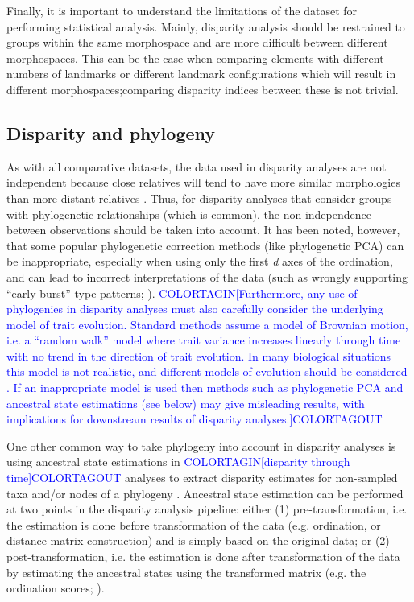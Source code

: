 \documentclass[12pt,letterpaper]{article}
\begin{document}
Finally, it is important to understand the limitations of the dataset for performing statistical analysis.
Mainly, disparity analysis should be restrained to groups within the same morphospace and are more difficult between different morphospaces.
This can be the case when comparing elements with different numbers of landmarks or different landmark configurations which will result in different morphospaces;comparing disparity indices between these is not trivial.

\subsection{Disparity and phylogeny} \label{section:phylo}

As with all comparative datasets, the data used in disparity analyses are not independent because close relatives will tend to have more similar morphologies than more distant relatives \citep{Harvey1998}.
Thus, for disparity analyses that consider groups with phylogenetic relationships (which is common), the non-independence between observations should be taken into account.
It has been noted, however, that some popular phylogenetic correction methods (like phylogenetic PCA) can be inappropriate, especially when using only the first \textit{d} axes of the ordination, and can lead to incorrect interpretations of the data (such as wrongly supporting ``early burst'' type patterns; \citealt{Uyeda2015}).
\textcolor{blue}{COLORTAGIN[Furthermore, any use of phylogenies in disparity analyses must also carefully consider the underlying model of trait evolution. Standard methods assume a model of Brownian motion, i.e. a ``random walk'' model where trait variance increases linearly through time with no trend in the direction of trait evolution. In many biological situations this model is not realistic, and different models of evolution should be considered \citealt{blomberg2020}. If an inappropriate model is used then methods such as phylogenetic PCA and ancestral state estimations (see below) may give misleading results, with implications for downstream results of disparity analyses.]COLORTAGOUT} 

One other common way to take phylogeny into account in disparity analyses is using ancestral state estimations in \textcolor{blue}{COLORTAGIN[disparity through time]COLORTAGOUT} analyses to extract disparity estimates for non-sampled taxa and/or nodes of a phylogeny \citep{brusatte2011phylogenetic,Guillerme2018}.
Ancestral state estimation can be performed at two points in the disparity analysis pipeline: either (1) pre-transformation, i.e. the estimation is done before transformation of the data (e.g. ordination, or distance matrix construction) and is simply based on the original data; or (2) post-transformation, i.e. the estimation is done after transformation of the data by estimating the ancestral states using the transformed matrix (e.g. the ordination scores; \citealt{lloyd2018}).
\end{document}
